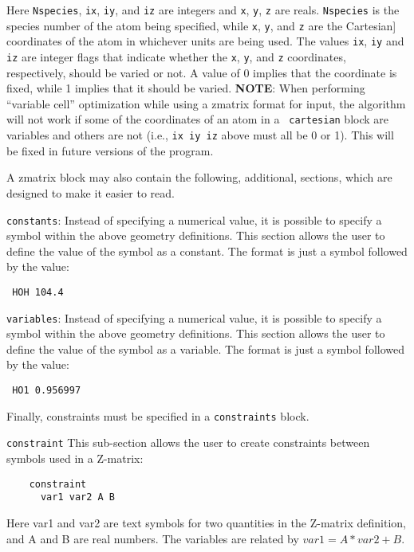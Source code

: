 \documentclass[11pt]{article}
\begin{document}
\begin{description}
Here \texttt{Nspecies}, \texttt{ix}, \texttt{iy}, and \texttt{iz} are
integers and \texttt{x}, \texttt{y}, \texttt{z} are
reals. \texttt{Nspecies} is the species number of the atom being
specified, while \texttt{x}, \texttt{y}, and \texttt{z} are the
Cartesian] coordinates of the atom in whichever units are being
used. The values \texttt{ix}, \texttt{iy} and \texttt{iz} are integer
flags that indicate whether the \texttt{x}, \texttt{y}, and \texttt{z}
coordinates, respectively, should be varied or not. A value of 0
implies that the coordinate is fixed, while 1 implies that it should
be varied.  {\bf NOTE}: When performing ``variable cell''
optimization while using a zmatrix format for input, the algorithm
will not work if some of the coordinates of an atom in a {\tt
cartesian} block are variables and others are not (i.e., 
\texttt{ix iy iz} above must all be 0 or 1). This will be fixed in
future versions of the program.

A zmatrix block may also contain the following, additional, sections, which
are designed to make it easier to read.

\item \texttt{constants}: Instead of specifying a numerical value, it
  is possible to specify a symbol within the above geometry
  definitions. This section allows the user to define the value of the
  symbol as a constant. The format is just a symbol followed by the
  value:

\noindent\texttt{      HOH 104.4}

\item \texttt{variables}: Instead of specifying a numerical value, it
  is possible to specify a symbol within the above geometry
  definitions. This section allows the user to define the value of the
  symbol as a variable. The format is just a symbol followed by the
  value:

\noindent\texttt{      HO1 0.956997}

Finally, constraints must be specified in a \texttt{constraints} block.

\item \texttt{constraint} This sub-section allows the user to create
  constraints between symbols used in a Z-matrix:
\begin{verbatim}
    constraint
      var1 var2 A B
\end{verbatim}
Here var1 and var2 are text symbols for two quantities in the Z-matrix
definition, and A and B are real numbers. The variables are related by
$var1 = A*var2 + B$.


\end{description}
\end{document}
